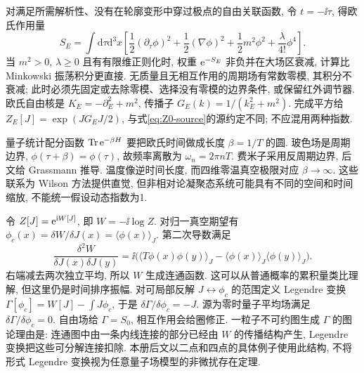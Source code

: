 对满足所需解析性、没有在轮廓变形中穿过极点的自由关联函数, 令 $t=-\ii\tau$, 得欧氏作用量
\[
S_E=\int\mathrm d\tau\mathrm d^3x\left[\frac12(\partial_\tau\phi)^2+
\frac12(\nabla\phi)^2+\frac12m^2\phi^2+\frac\lambda{4!}\phi^4\right].
\]
当 $m^2>0$, $\lambda\ge0$ 且有有限维正则化时, 权重 $\mathrm e^{-S_E}$ 非负并在大场区衰减, 计算比 Minkowski 振荡积分更直接. 无质量且无相互作用的周期场有常数零模, 其积分不衰减; 此时必须先固定或去除零模、选择没有零模的边界条件, 或保留红外调节器. 欧氏自由核是 $K_E=-\partial_E^2+m^2$, 传播子 $G_E(k)=1/(k_E^2+m^2)$. 完成平方给 $Z_E[J]=\exp(JG_EJ/2)$, 与式\eqref{eq:Z0-source}的源约定不同; 不应混用两种指数.

量子统计配分函数 $\operatorname{Tr}\mathrm e^{-\beta H}$ 要把欧氏时间做成长度 $\beta=1/T$ 的圆. 玻色场是周期边界, $\phi(\tau+\beta)=\phi(\tau)$, 故频率离散为 $\omega_n=2\pi nT$. 费米子采用反周期边界, 后文给 Grassmann 推导. 温度像逆时间长度, 而四维零温真空极限对应 $\beta\to\infty$. 这些联系为 Wilson 方法提供直觉, 但非相对论凝聚态系统可能具有不同的空间和时间缩放, 不能统一假设动态指数为1.

令 $Z[J]=\mathrm e^{\mathrm i W[J]}$, 即 $W=-\ii\log Z$. 对归一真空期望有 $\phi_c(x)=\delta W/\delta J(x)=\langle\phi(x)\rangle_J$. 第二次导数满足
\[
\frac{\delta^2W}{\delta J(x)\delta J(y)}
=\ii\big(\langle T\phi(x)\phi(y)\rangle_J-\langle\phi(x)\rangle_J\langle\phi(y)\rangle_J\big).
\]
右端减去两次独立平均, 所以 $W$ 生成连通函数. 这可以从普通概率的累积量类比理解, 但这里仍是时间排序振幅. 对可局部反解 $J\leftrightarrow\phi_c$ 的范围定义 Legendre 变换 $\Gamma[\phi_c]=W[J]-\int J\phi_c$, 于是 $\delta\Gamma/\delta\phi_c=-J$. 源为零时量子平均场满足 $\delta\Gamma/\delta\phi_c=0$. 自由场给 $\Gamma=S_0$, 相互作用会给圈修正. 一粒子不可约图生成 $\Gamma$ 的图论理由是: 连通图中由一条内线连接的部分已经由 $W$ 的传播结构产生, Legendre 变换把这些可分解连接扣除. 本册后文以二点和四点的具体例子使用此结构, 不将形式 Legendre 变换视为任意量子场模型的非微扰存在定理.
